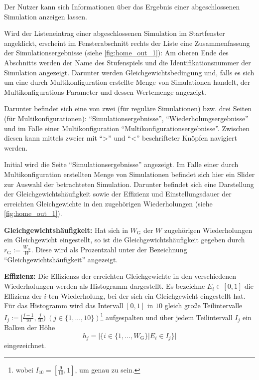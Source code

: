\documentclass[parskip=full,11pt]{scrartcl}
\begin{document}
Der \Gls{Nutzer} kann sich Informationen über das Ergebnis einer abgeschlossenen Simulation anzeigen lassen.

Wird der Listeneintrag einer abgeschlossenen Simulation im Startfenster angeklickt, erscheint im Fensterabschnitt rechts der Liste eine Zusammenfassung der Simulationsergebnisse (siehe \cref{fig:home_out_1}): Am oberen Ende des Abschnitts werden der Name des Stufenspiels und die Identifikationsnummer der Simulation angezeigt. Darunter werden Gleichgewichtsbedingung und, falls es sich um eine durch Multikonfiguration erstellte Menge von Simulationen handelt, der Multikonfigurations-Parameter und dessen Wertemenge angezeigt.

Darunter befindet sich eine von zwei (für reguläre Simulationen) bzw. drei Seiten (für Multikonfigurationen): \enquote{Simulationsergebnisse}, \enquote{Wiederholungsergebnisse} und im Falle einer Multikonfiguration \enquote{Multikonfigurationsergebnisse}. Zwischen diesen kann mittels zweier mit \enquote{>} und \enquote{<} beschrifteter Knöpfen navigiert werden.

Initial wird die Seite \enquote{Simulationsergebnisse} angezeigt. Im Falle einer durch Multikonfiguration erstellten Menge von Simulationen befindet sich hier ein Slider zur Auswahl der betrachteten Simulation. Darunter befindet sich eine Darstellung der Gleichgewichtshäufigkeit sowie der \Gls{Effizienz} und \Gls{Einstellungsdauer} der erreichten Gleichgewichte in den zugehörigen Wiederholungen (siehe \cref{fig:home_out_1}).

\textbf{Gleichgewichtshäufigkeit:}
Hat sich in \(W_\text{G}\) der \(W\) zugehörigen Wiederholungen ein Gleichgewicht eingestellt, so ist die Gleichgewichtshäufigkeit gegeben durch \(r_\text{G} := \frac{W_\text{G}}{W}\). Diese wird als Prozentzahl unter der Bezeichnung \enquote{Gleichgewichtshäufigkeit} angezeigt.

\textbf{\Gls{Effizienz}:}
Die \Glspl{Effizienz} der erreichten Gleichgewichte in den verschiedenen Wiederholungen werden als Histogramm dargestellt. Es bezeichne \(E_i \in [0,1]\) die \Gls{Effizienz} der \(i\)-ten Wiederholung, bei der sich ein Gleichgewicht eingestellt hat. Für das Histogramm wird das Intervall \([0,1]\) in \(10\) gleich große Teilintervalle \(I_j := [\frac{j-1}{10},\frac{j}{10}) \ (j \in \{1,...,10\})\)\footnote{wobei \(I_{10} = [\frac{9}{10},1]\), um genau zu sein.} aufgespalten und über jedem Teilintervall \(I_j\) ein Balken der Höhe
\[
h_j = |\{i \in \{1,...,W_\text{G}\} | E_i \in I_j\}|
\]
eingezeichnet.
\end{document}
